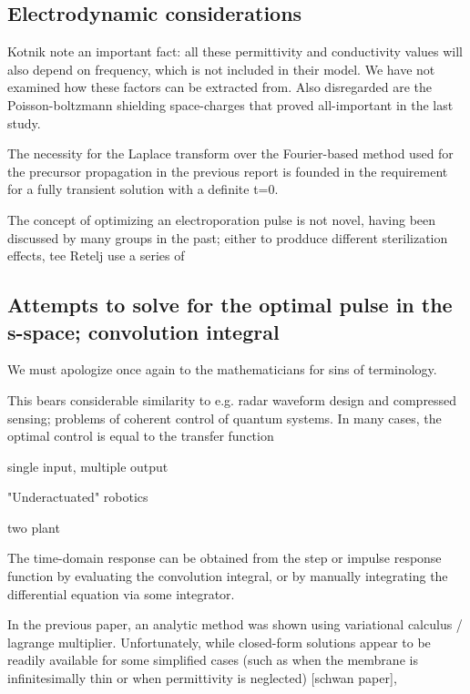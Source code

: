\documentclass[fleqn,10pt]{paper}
\begin{document}

\subsection*{Electrodynamic considerations}

Kotnik note an important fact: all these permittivity and conductivity values will also depend on frequency, which is not included in their model. We have not examined how these factors can be extracted from. Also disregarded are the Poisson-boltzmann shielding space-charges that proved all-important in the last study. 

The necessity for the Laplace transform over the Fourier-based method used for the precursor propagation in the previous report is founded in the requirement for a fully transient solution with a definite t=0.

The concept of optimizing an electroporation pulse is not novel, having been discussed by many groups in the past; either to prodduce different sterilization effects, tee Retelj use a series of 

\subsection{Attempts to solve for the optimal pulse in the s-space; convolution integral}

We must apologize once again to the mathematicians for sins of terminology.



This bears considerable similarity to e.g. radar waveform design and compressed sensing; problems of coherent control of quantum systems. In many cases, the optimal control is equal to the transfer function


single input, multiple output 

"Underactuated" robotics

two plant

The time-domain response can be obtained from the step or impulse response function by evaluating the convolution integral, or by manually integrating the differential equation via some integrator.

In the previous paper, an analytic method was shown using variational calculus / lagrange multiplier. Unfortunately, while closed-form solutions appear to be readily available for some simplified cases (such as when the membrane is infinitesimally thin or when permittivity is neglected) [schwan paper], 
\end{document}
